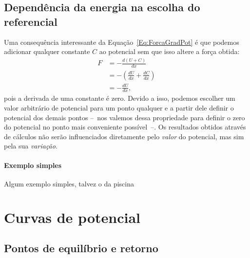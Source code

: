 \subsection{Dependência da energia na escolha do referencial}

Uma consequência interessante da Equação~\eqref{Eq:ForcaGradPot} é que podemos adicionar qualquer constante $C$ ao potencial sem que isso altere a força obtida:
\begin{align}
  F &= - \frac{d(U+C)}{dx} \\
  &= -\left(\frac{dU}{dx} + \frac{dC}{dx}\right) \\
  &= -\frac{dU}{dx},
\end{align}
%
pois a derivada de uma constante é zero. Devido a isso, podemos escolher um valor arbitrário de potencial para um ponto qualquer e a partir dele definir o potencial dos demais pontos --~nos valemos dessa propriedade para definir o zero do potencial no ponto mais conveniente possível~--. Os resultados obtidos através de cálculos não serão influenciados diretamente pelo \emph{valor} do potencial, mas sim pela sua \emph{variação}. 


\paragraph{Exemplo simples}
Algum exemplo simples, talvez o da piscina

\section{Curvas de potencial}

\subsection{Pontos de equilíbrio e retorno}

